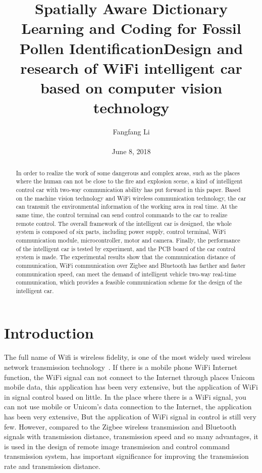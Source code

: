 \documentclass[10pt,twocolumn,letterpaper]{article}
\title{\textbf{Spatially Aware Dictionary Learning and Coding for Fossil Pollen IdentificationDesign and research of WiFi intelligent car based on computer vision technology
}}
\author{Fangfang Li\\\\June 8, 2018}
\begin{document}
\maketitle

\begin{abstract}
   In order to realize the work of some dangerous and complex areas, such as the places where the human can not be close to the fire and explosion scene, a kind of intelligent control car with two-way communication ability has put forward in this paper. Based on the machine vision technology and WiFi wireless communication technology, the car can transmit the environmental information of the working area in real time. At the same time, the control terminal can send control commands to the car to realize remote control. The overall framework of the intelligent car is designed, the whole system is composed of six parts, including power supply, control terminal, WiFi communication module, microcontroller, motor and camera. Finally, the performance of the intelligent car is tested by experiment, and the PCB board of the car control system is made. The experimental results show that the communication distance of communication, WiFi communication over Zigbee and Bluetooth has farther and faster communication speed, can meet the demand of intelligent vehicle two-way real-time communication, which provides a feasible communication scheme for the design of the intelligent car.
\end{abstract}

\section{Introduction}
The full name of Wifi is wireless fidelity, is one of the most widely used wireless network transmission technology~\cite{moeslund2001survey}. If there is a mobile phone WiFi Internet function, the WiFi signal can not connect to the Internet through places Unicom mobile data, this application has been very extensive, but the application of WiFi in signal control based on little. In the place where there is a WiFi signal, you can not use mobile or Unicom's data connection to the Internet, the application has been very extensive, But the application of WiFi signal in control is still very few. However, compared to the Zigbee wireless transmission and Bluetooth signals with transmission distance, transmission speed and so many advantages, it is used in the design of remote image transmission and control command transmission system, has important significance for improving the transmission rate and transmission distance.
\end{document}
